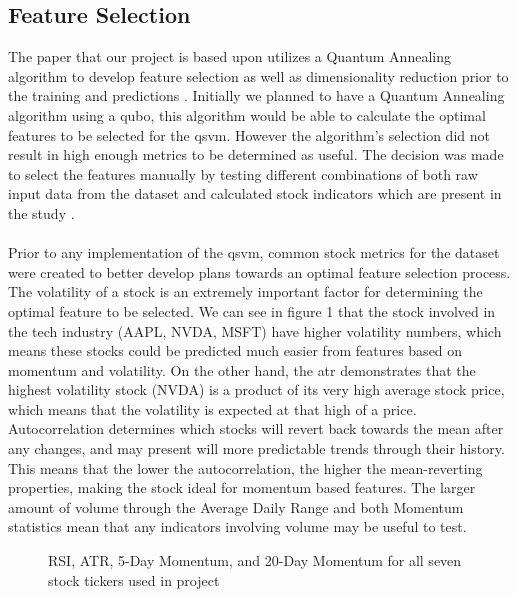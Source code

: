 \documentclass{article}
\begin{document}
\subsection{Feature Selection}
The paper that our project is based upon utilizes a Quantum Annealing algorithm to develop feature selection as well as dimensionality reduction prior to the training and predictions \cite{srivastava2023}. Initially we planned to have a Quantum Annealing algorithm using a \gls{qubo}, this algorithm would be able to calculate the optimal features to be selected for the \gls{qsvm}. However the algorithm's selection did not result in high enough metrics to be determined as useful. The decision was made to select the features manually by testing different combinations of both raw input data from the dataset and calculated stock indicators which are present in the study \cite{srivastava2023}. 
\\ \\ Prior to any implementation of the \gls{qsvm}, common stock metrics for the dataset were created to better develop plans towards an optimal feature selection process. The volatility of a stock is an extremely important factor for determining the optimal feature to be selected. We can see in figure 1 that the stock involved in the tech industry (AAPL, NVDA, MSFT) have higher volatility numbers, which means these stocks could be predicted much easier from features based on momentum and volatility. On the other hand, the \gls{atr} demonstrates that the highest volatility stock (NVDA) is a product of its very high average stock price, which means that the volatility is expected at that high of a price. Autocorrelation determines which stocks will revert back towards the mean after any changes, and may present will more predictable trends through their history. This means that the lower the autocorrelation, the higher the mean-reverting properties, making the stock ideal for momentum based features. The larger amount of volume through the Average Daily Range and both Momentum statistics mean that any indicators involving volume may be useful to test. 
\begin{figure}[H]
    \centering
    \caption{RSI, ATR, 5-Day Momentum, and 20-Day Momentum for all seven stock tickers used in project}
    \label{fig:1}
\end{figure}
\end{document}
